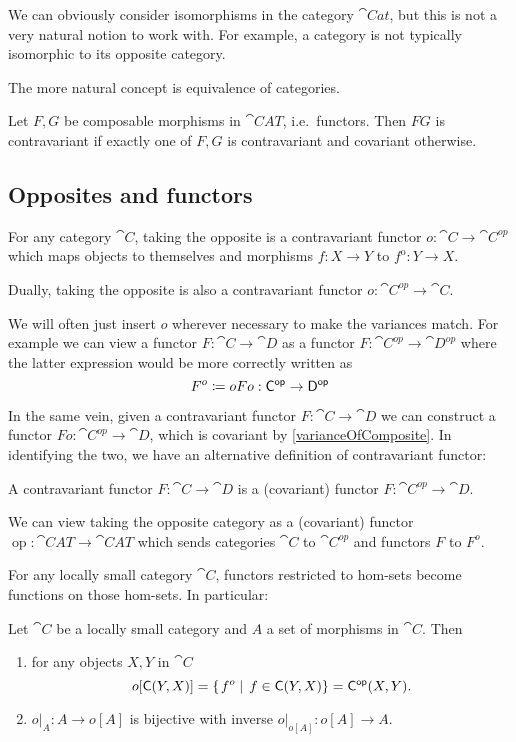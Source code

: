 We can obviously consider isomorphisms in the category $\cat{Cat}$, but this is not a very natural notion to work with. For example, a category is not typically isomorphic to its opposite category.

The more natural concept is equivalence of categories.

\begin{lemma} \label{varianceOfComposite}
Let $F,G$ be composable morphisms in $\cat{CAT}$, i.e.\ functors. Then $FG$ is contravariant if exactly one of $F,G$ is contravariant and covariant otherwise.
\end{lemma}

\subsection{Opposites and functors}
\begin{lemma}
For any category $\cat{C}$, taking the opposite is a contravariant functor $o: \cat{C}\to \cat{C^{op}}$ which maps objects to themselves and morphisms $f:X\to Y$ to $f^\text{o}: Y\to X$.

Dually, taking the opposite is also a contravariant functor $o: \cat{C^{op}}\to \cat{C}$.
\end{lemma}

We will often just insert $o$ wherever necessary to make the variances match. For example we can view a functor $F:\cat{C}\to \cat{D}$ as a functor $F:\cat{C^{op}}\to \cat{D^{op}}$ where the latter expression would be more correctly written as
\[ F^o \coloneqq oFo: \mathsf{C^{op}}\to \mathsf{D^{op}} \]

In the same vein, given a contravariant functor $F:\cat{C}\to \cat{D}$ we can construct a functor $Fo: \cat{C^{op}}\to \cat{D}$, which is covariant by \ref{varianceOfComposite}. In identifying the two, we have an alternative definition of contravariant functor:

\begin{lemma}
A contravariant functor $F:\cat{C}\to\cat{D}$ is a (covariant) functor $F:\cat{C^{op}}\to \cat{D}$.
\end{lemma}


\begin{lemma}
We can view taking the opposite category as a (covariant) functor $\operatorname{op}: \cat{CAT} \to \cat{CAT}$ which sends categories $\cat{C}$ to $\cat{C^{op}}$ and functors $F$ to $F^o$.
\end{lemma}


For any locally small category $\cat{C}$, functors restricted to hom-sets become functions on those hom-sets. In particular:
\begin{lemma}
Let $\cat{C}$ be a locally small category and $A$ a set of morphisms in $\cat{C}$. Then
\begin{enumerate}
\item for any objects $X,Y$ in $\cat{C}$
\[ o[\mathsf{C}(Y,X)] = \left\{\left. f^o \;\right|\; f \in \mathsf{C}(Y,X) \right\} = \mathsf{C^{op}}(X,Y).  \]
\item $o|_A: A \to o[A]$ is bijective with inverse $o|_{o[A]}: o[A] \to A$.
\end{enumerate}
\end{lemma}

